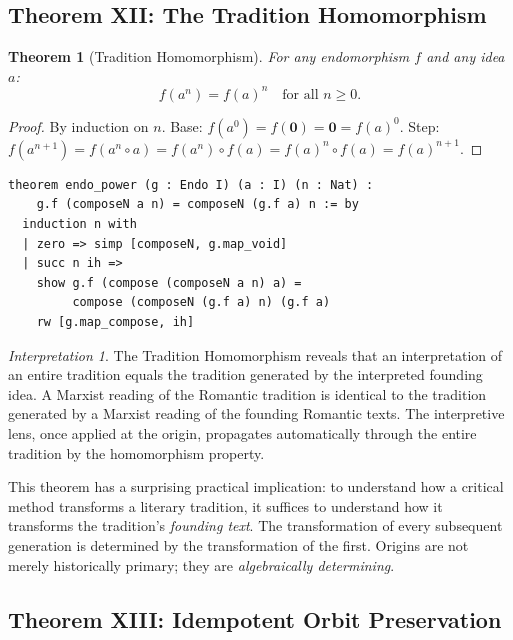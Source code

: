 \documentclass[11pt,openany]{book}
\theoremstyle{definition}
\theoremstyle{plain}
\newtheorem{theorem}[axiom]{Theorem}
\theoremstyle{remark}
\newtheorem{interpretation}[axiom]{Interpretation}
\newcommand{\compose}{\circ}                 %
\newcommand{\void}{\mathbf{0}}              %
\begin{document}
\subsection{Theorem XII: The Tradition Homomorphism}

\begin{theorem}[Tradition Homomorphism]
\label{thm:key-tradition-hom}
For any endomorphism $f$ and any idea $a$:
\[
f(a^n) = f(a)^n \quad \text{for all } n \geq 0.
\]
\end{theorem}

\begin{proof}
By induction on $n$. Base: $f(a^0) = f(\void) = \void = f(a)^0$. Step: $f(a^{n+1}) = f(a^n \compose a) = f(a^n) \compose f(a) = f(a)^n \compose f(a) = f(a)^{n+1}$.
\end{proof}

\begin{lstlisting}[language=Lean4]
theorem endo_power (g : Endo I) (a : I) (n : Nat) :
    g.f (composeN a n) = composeN (g.f a) n := by
  induction n with
  | zero => simp [composeN, g.map_void]
  | succ n ih =>
    show g.f (compose (composeN a n) a) =
         compose (composeN (g.f a) n) (g.f a)
    rw [g.map_compose, ih]
\end{lstlisting}

\begin{interpretation}
The Tradition Homomorphism reveals that an interpretation of an entire tradition equals the tradition generated by the interpreted founding idea. A Marxist reading of the Romantic tradition is identical to the tradition generated by a Marxist reading of the founding Romantic texts. The interpretive lens, once applied at the origin, propagates automatically through the entire tradition by the homomorphism property.

This theorem has a surprising practical implication: to understand how a critical method transforms a literary tradition, it suffices to understand how it transforms the tradition's \emph{founding text}. The transformation of every subsequent generation is determined by the transformation of the first. Origins are not merely historically primary; they are \emph{algebraically determining}.
\end{interpretation}

\subsection{Theorem XIII: Idempotent Orbit Preservation}
\end{document}
